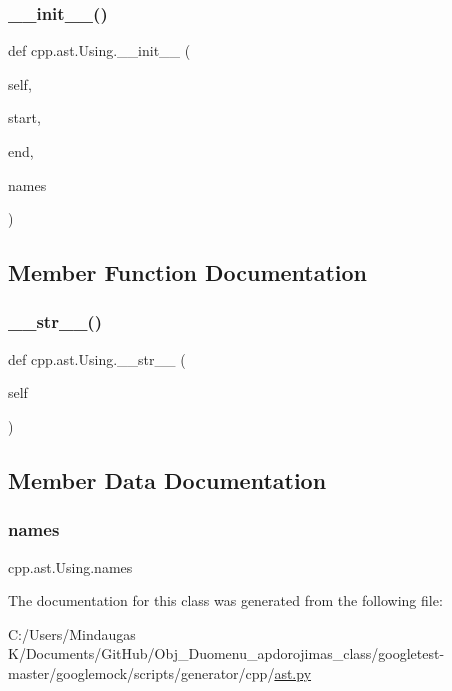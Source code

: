 \subsubsection{\texorpdfstring{\_\_init\_\_()}{\_\_init\_\_()}}
{\footnotesize\ttfamily def cpp.\+ast.\+Using.\+\_\+\+\_\+init\+\_\+\+\_\+ (\begin{DoxyParamCaption}\item[{}]{self,  }\item[{}]{start,  }\item[{}]{end,  }\item[{}]{names }\end{DoxyParamCaption})}



\subsection{Member Function Documentation}
\mbox{\label{classcpp_1_1ast_1_1_using_ac209e8e5d84988d14a8f4b30377e5455}} 
\subsubsection{\texorpdfstring{\_\_str\_\_()}{\_\_str\_\_()}}
{\footnotesize\ttfamily def cpp.\+ast.\+Using.\+\_\+\+\_\+str\+\_\+\+\_\+ (\begin{DoxyParamCaption}\item[{}]{self }\end{DoxyParamCaption})}



\subsection{Member Data Documentation}
\mbox{\label{classcpp_1_1ast_1_1_using_abc05dedb59eb83857d373cc0e64eccb3}} 
\subsubsection{\texorpdfstring{names}{names}}
{\footnotesize\ttfamily cpp.\+ast.\+Using.\+names}



The documentation for this class was generated from the following file\+:\begin{DoxyCompactItemize}
\item 
C\+:/\+Users/\+Mindaugas K/\+Documents/\+Git\+Hub/\+Obj\+\_\+\+Duomenu\+\_\+apdorojimas\+\_\+class/googletest-\/master/googlemock/scripts/generator/cpp/\mbox{\hyperlink{googletest-master_2googlemock_2scripts_2generator_2cpp_2ast_8py}{ast.\+py}}\end{DoxyCompactItemize}

